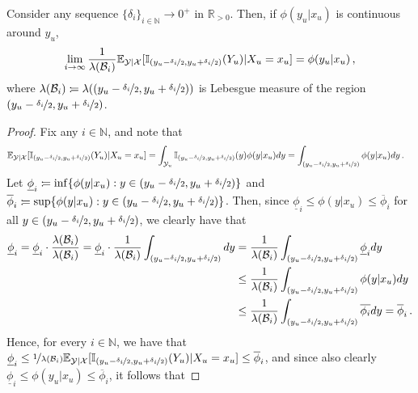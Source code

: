 \documentclass[twoside,11pt]{article}
\newcommand{\nats}{\mathbb{N}}
\newcommand{\reals}{\mathbb{R}}
\newcommand{\realspos}{\reals_{>0}}
\newcommand{\states}{\mathcal{X}}
\newcommand{\observs}{\mathcal{Y}}
\newcommand{\ind}[1]{\mathbb{I}_{#1}}
\newcommand{\coloneqq}{:\!=}
\begin{document}
\begin{lemma}\label{lemma:dirac_delta_gets_density_value}
Consider any sequence $\{\delta_i\}_{i\in\nats}\to 0^+$ in $\realspos$. Then, if $\phi(y_u\vert x_u)$ is continuous around $y_u$,
\begin{equation*}
\lim_{i\to\infty} \frac{1}{\lambda(\mathcal{B}_i)}\mathbb{E}_{\observs\vert\states}[\ind{(y_u-\nicefrac{\delta_i}{2},y_u+\nicefrac{\delta_i}{2})}(Y_u)\vert X_u=x_u] = \phi(y_u\vert x_u)\,,
\end{equation*}
where $\lambda(\mathcal{B}_i)\coloneqq \lambda((y_u-\nicefrac{\delta_i}{2},y_u+\nicefrac{\delta_i}{2}))$ is Lebesgue measure of the region $(y_u-\nicefrac{\delta_i}{2},y_u+\nicefrac{\delta_i}{2})$.
\end{lemma}
\begin{proof}
Fix any $i\in\nats$, and note that
\begin{align*}
\mathbb{E}_{\observs\vert\states}[\ind{(y_u-\nicefrac{\delta_i}{2},y_u+\nicefrac{\delta_i}{2})}(Y_u)\vert X_u=x_u] &= \int_{\observs_u}\ind{(y_u-\nicefrac{\delta_i}{2},y_u+\nicefrac{\delta_i}{2})}(y)\phi(y\vert x_u) dy 
= \int_{(y_u-\nicefrac{\delta_i}{2},y_u+\nicefrac{\delta_i}{2})}\phi(y\vert x_u) dy\,.
\end{align*}
Let $\underline{\phi}_i\coloneqq \inf\{\phi(y\vert x_u):y\in(y_u-\nicefrac{\delta_i}{2},y_u+\nicefrac{\delta_i}{2})\}$ and $\overline{\phi}_i\coloneqq \sup\{\phi(y\vert x_u):y\in(y_u-\nicefrac{\delta_i}{2},y_u+\nicefrac{\delta_i}{2})\}$. Then, since $\underline{\phi}_i \leq \phi(y\vert x_u)\leq \overline{\phi}_i$ for all $y\in(y_u-\nicefrac{\delta_i}{2},y_u+\nicefrac{\delta_i}{2})$, we clearly have that
\begin{align*}
\underline{\phi}_i = \underline{\phi}_i\cdot\frac{\lambda(\mathcal{B}_i)}{\lambda(\mathcal{B}_i)} = \underline{\phi}_i\cdot\frac{1}{\lambda(\mathcal{B}_i)}\int_{(y_u-\nicefrac{\delta_i}{2},y_u+\nicefrac{\delta_i}{2})}dy &= \frac{1}{\lambda(\mathcal{B}_i)}\int_{(y_u-\nicefrac{\delta_i}{2},y_u+\nicefrac{\delta_i}{2})}\underline{\phi}_idy
 \\
 &\leq \frac{1}{\lambda(\mathcal{B}_i)}\int_{(y_u-\nicefrac{\delta_i}{2},y_u+\nicefrac{\delta_i}{2})}\phi(y\vert x_u) dy \\
 &\leq \frac{1}{\lambda(\mathcal{B}_i)}\int_{(y_u-\nicefrac{\delta_i}{2},y_u+\nicefrac{\delta_i}{2})}\overline{\phi_i} dy  = \overline{\phi}_i\,.
\end{align*}
Hence, for every $i\in\nats$, we have that $\underline{\phi}_i\leq\nicefrac{1}{\lambda(\mathcal{B}_i)}\mathbb{E}_{\observs\vert\states}[\ind{(y_u-\nicefrac{\delta_i}{2},y_u+\nicefrac{\delta_i}{2})}(Y_u)\vert X_u=x_u]\leq\overline{\phi}_i$, and since also clearly $\underline{\phi}_i\leq \phi(y_u\vert x_u)\leq \overline{\phi}_i$, it follows that

\end{proof}
\end{document}
